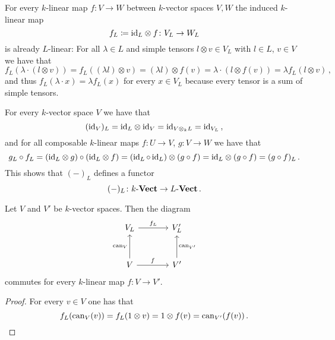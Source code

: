\begin{fluff}
  For every $k$-linear map $f \colon V \to W$ between $k$-vector spaces $V, W$ the induced $k$-linear map
  \[
              f_L
    \coloneqq {\operatorname{id}_L} \otimes f
    \colon    V_L
    \to       W_L
  \]
  is already $L$-linear:
  For all $\lambda \in L$ and simple tensors $l \otimes v \in V_L$ with $l \in L$, $v \in V$ we have that
  \[
      f_L( \lambda \cdot (l \otimes v) )
    = f_L( (\lambda l) \otimes v )
    = (\lambda l) \otimes f(v)
    = \lambda \cdot (l \otimes f(v))
    = \lambda f_L(l \otimes v) \,,
  \]
  and thus $f_L( \lambda \cdot x ) = \lambda f_L(x)$ for every $x \in V_L$ because every tensor is a sum of simple tensors.
  
  For every $k$-vector space $V$ we have that
  \[
      (\operatorname{id}_V)_L
    = {\operatorname{id}_L} \otimes {\operatorname{id}_V}
    = \operatorname{id}_{V \otimes_k L}
    = \operatorname{id}_{V_L} \,,
  \]
  and for all composable $k$-linear maps $f \colon U \to V$, $g \colon V \to W$ we have that
  \[
      g_L \circ f_L
    = ({\operatorname{id}_L} \otimes g) \circ ({\operatorname{id}_L} \otimes f)
    = (\operatorname{id}_L \circ \operatorname{id}_L) \otimes (g \circ f)
    = {\operatorname{id}_L} \otimes (g \circ f)
    = (g \circ f)_L \,.
  \]
  This shows that $(-)_L$ defines a functor
  \[
            (-)_L
    \colon  k\text{-}\mathbf{Vect}
    \to     L\text{-}\mathbf{Vect} \,.
  \]
\end{fluff}

\begin{lemma}
  \label{lemma: abstract description of fL}
  Let $V$ and $V'$ be $k$-vector spaces.
  Then the diagram
  \[
    \begin{tikzcd}[sep = large]
        V_L
        \arrow{r}[above]{f_L}
      & V'_L
      \\
        V
        \arrow{r}[above]{f}
        \arrow{u}[left]{\can_V}
      & V'
        \arrow{u}[right]{\can_{V'}}
    \end{tikzcd}
  \]
  commutes for every $k$-linear map $f \colon V \to V'$.
\end{lemma}
\begin{proof}
  For every $v \in V$ one has that
  \[
          f_L(\operatorname{can}_V(v))
      =  f_L(1 \otimes v)
      =  1 \otimes f(v)
      =  \operatorname{can}_{V'}(f(v)) \,.
    \qedhere
  \]
\end{proof}



